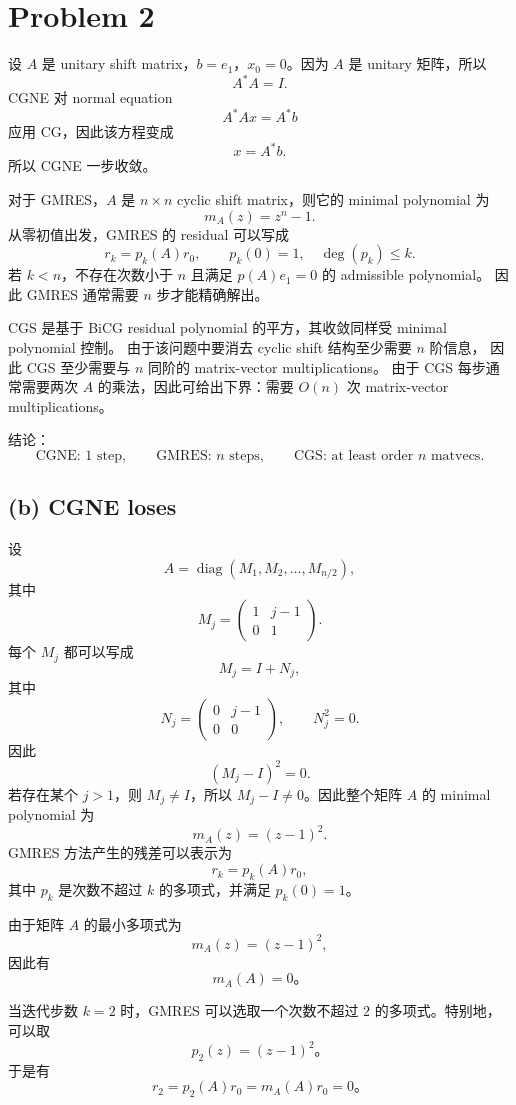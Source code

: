 \documentclass{ctexart}
\begin{document}
\section{Problem 2}
\begin{solution}
  设 $A$ 是 unitary shift matrix，$b=e_1$，$x_0=0$。因为 $A$ 是 unitary 矩阵，所以
  \[
    A^*A=I.
  \]
  CGNE 对 normal equation
  \[
    A^*Ax=A^*b
  \]
  应用 CG，因此该方程变成
  \[
    x=A^*b.
  \]
  所以 CGNE 一步收敛。

  对于 GMRES，$A$ 是 $n\times n$ cyclic shift matrix，则它的 minimal polynomial 为
  \[
    m_A(z)=z^n-1.
  \]
  从零初值出发，GMRES 的 residual 可以写成
  \[
    r_k=p_k(A)r_0, \qquad p_k(0)=1,\quad \deg(p_k)\le k.
  \]
  若 $k<n$，不存在次数小于 $n$ 且满足 $p(A)e_1=0$ 的 admissible polynomial。
  因此 GMRES 通常需要 $n$ 步才能精确解出。

  CGS 是基于 BiCG residual polynomial 的平方，其收敛同样受 minimal polynomial 控制。
  由于该问题中要消去 cyclic shift 结构至少需要 $n$ 阶信息，
  因此 CGS 至少需要与 $n$ 同阶的 matrix-vector multiplications。
  由于 CGS 每步通常需要两次 $A$ 的乘法，因此可给出下界：需要 $O(n)$ 次 matrix-vector multiplications。

  结论：
  \[
    \text{CGNE: 1 step}, \qquad \text{GMRES: } n \text{ steps}, \qquad \text{CGS: at least order } n \text{ matvecs}.
  \]

  \subsection*{(b) CGNE loses}
  设
  \[
    A=\operatorname{diag}(M_1,M_2,\ldots,M_{n/2}),
  \]
  其中
  \[
    M_j=
    \begin{pmatrix}1&j-1\\0&1
    \end{pmatrix}.
  \]
  每个 $M_j$ 都可以写成
  \[
    M_j=I+N_j,
  \]
  其中
  \[
    N_j=
    \begin{pmatrix}0&j-1\\0&0
    \end{pmatrix}, \qquad N_j^2=0.
  \]
  因此
  \[
    (M_j-I)^2=0.
  \]
  若存在某个 $j>1$，则 $M_j\ne I$，所以 $M_j-I\ne 0$。因此整个矩阵 $A$ 的 minimal polynomial 为
  \[
    m_A(z)=(z-1)^2.
  \]
  GMRES 方法产生的残差可以表示为
  \[
    r_k = p_k(A) r_0,
  \]
  其中 $p_k$ 是次数不超过 $k$ 的多项式，并满足 $p_k(0)=1$。

  由于矩阵 $A$ 的最小多项式为
  \[
    m_A(z) = (z-1)^2,
  \]
  因此有
  \[
    m_A(A) = 0。
  \]

  当迭代步数 $k=2$ 时，GMRES 可以选取一个次数不超过 $2$ 的多项式。特别地，可以取
  \[
    p_2(z) = (z-1)^2。
  \]
  于是有
  \[
    r_2 = p_2(A) r_0 = m_A(A) r_0 = 0。
  \]


\end{solution}
\end{document}
